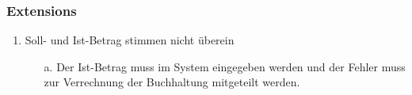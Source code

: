 \documentclass[./detailed_overview_usecases.tex]{subfiles}
\begin{document}
    \subsubsection*{Extensions}
    \begin{enumerate}
        \item Soll- und Ist-Betrag stimmen nicht überein
        \begin{itemize}
            \item[a.] Der Ist-Betrag muss im System eingegeben werden und der Fehler
            muss zur Verrechnung der Buchhaltung mitgeteilt werden.
        \end{itemize}
    \end{enumerate}
\end{document}
